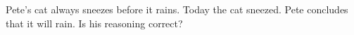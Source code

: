 Pete's cat always sneezes before it rains. Today the cat sneezed. Pete concludes that it will rain. Is his reasoning correct?
